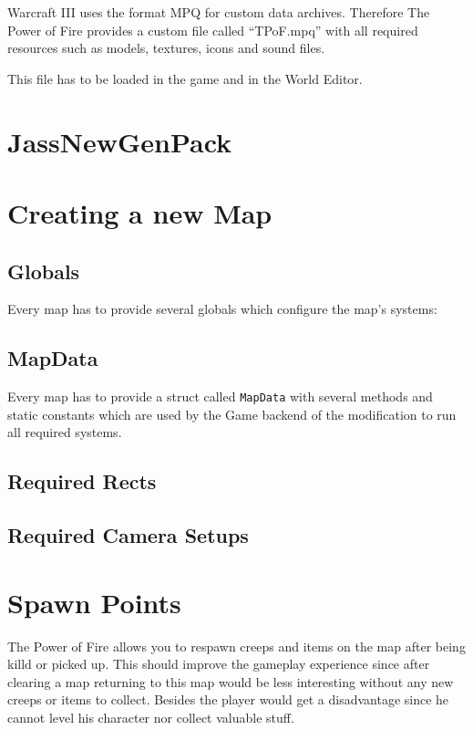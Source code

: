 \documentclass[a4paper,12pt,titlepage]{report}
\begin{document}
Warcraft III uses the format MPQ for custom data archives. Therefore The Power of Fire provides a custom file called \enquote{TPoF.mpq} with all required resources such as models, textures, icons and sound files.

This file has to be loaded in the game and in the World Editor.

\newpage

\chapter{JassNewGenPack}

\newpage

\chapter{Creating a new Map}

\section{Globals}

Every map has to provide several globals which configure the map's systems:

\section{MapData}

Every map has to provide a struct called \lstinline[]{MapData} with several methods and static constants which are used by the Game backend of the modification to run all required systems.

\section{Required Rects}

\section{Required Camera Setups}

\newpage

\chapter{Spawn Points}

The Power of Fire allows you to respawn creeps and items on the map after being killd or picked up. This should improve the gameplay experience since after clearing a map returning to this map would be less interesting without any new creeps or items to collect.
Besides the player would get a disadvantage since he cannot level his character nor collect valuable stuff.
\end{document}
